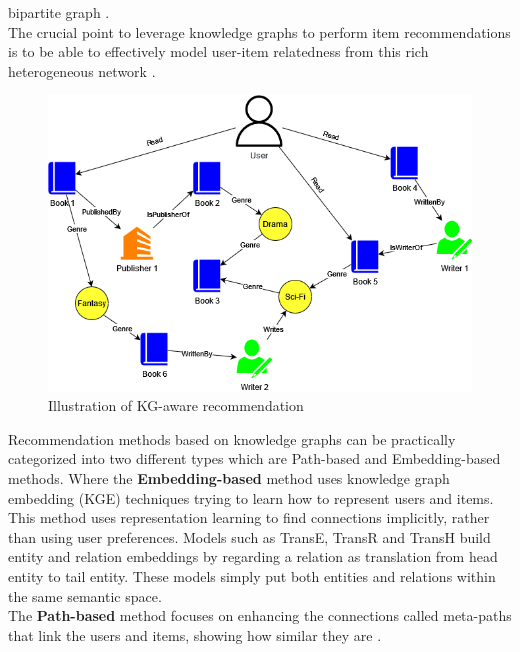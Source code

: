 \documentclass[\myFontSize,a4paper,oneside,hidelinks]{article}
\begin{document}
bipartite graph \cite{pub.1120733877}. \\
The crucial point to leverage knowledge graphs to perform item recommendations is to be able to effectively model user-item relatedness from this rich heterogeneous network \cite{Palumbo201732}. \\ 
%
%
\begin{figure}[h!]
    \centering
    \includegraphics[width=1\textwidth]{img/knowledge_graph_example.png}
    \caption{Illustration of KG-aware recommendation}
    \label{fig:knowledge_graph_example}
\end{figure}
%
%
\newpage{}
Recommendation methods based on knowledge graphs can be practically categorized into two different types which are Path-based and Embedding-based methods. Where the \textbf{Embedding-based} method uses knowledge graph embedding (KGE) techniques trying to learn how to represent users and items. This method uses representation learning to find connections implicitly, rather than using user preferences. Models such as TransE, TransR and TransH build entity and relation embeddings by regarding a relation as translation from head entity to tail entity. These models simply put both entities and relations within the same semantic space. \cite{pub.1148917041}\\
The \textbf{Path-based} method focuses on enhancing the connections called meta-paths that link the users and items, showing how similar they are \cite{Yang20229308}. 
%
\end{document}
